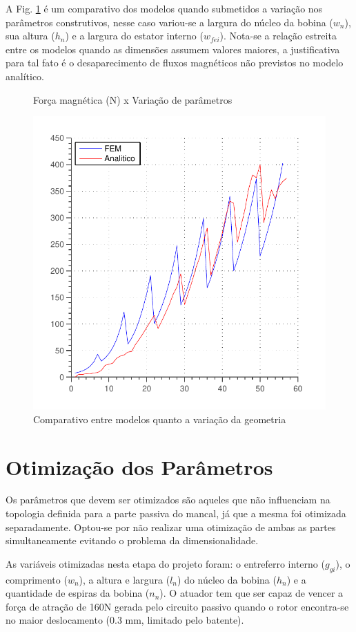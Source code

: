 A Fig. \ref{fig:validacao_ativo_2d} é um comparativo dos modelos quando submetidos a variação nos parâmetros construtivos, nesse caso variou-se a largura do núcleo da bobina ($w_n$), sua altura ($h_n$) e a largura do estator interno ($w_{fei}$). Nota-se a relação estreita entre os modelos quando as dimensões assumem valores maiores, a justificativa para tal fato é o desaparecimento de fluxos magnéticos não previstos no modelo analítico.

\begin{figure}[th]
	\centering
	\caption{Força magnética (N) x Variação de parâmetros}
	\includegraphics[width=0.7\linewidth]{Figs/Simulacoes/Ativo/validacao_ativo_2d}
	\caption{Comparativo entre modelos quanto a variação da geometria}
	\label{fig:validacao_ativo_2d}
\end{figure}

\section{Otimização dos Parâmetros}

Os parâmetros que devem ser otimizados são aqueles que não influenciam na topologia definida para a parte passiva do mancal, já que a mesma foi otimizada separadamente. Optou-se por não realizar uma otimização de ambas as partes simultaneamente evitando o problema da dimensionalidade.

As variáveis otimizadas nesta etapa do projeto foram:   o entreferro interno ($g_{gi}$), o comprimento ($w_n$), a altura  e largura ($l_n$) do núcleo da bobina ($h_n$) e a quantidade de espiras da bobina ($n_n$). O atuador tem que ser capaz de vencer a força de atração de 160N gerada pelo circuito passivo quando o rotor encontra-se no maior deslocamento (0.3 mm, limitado pelo batente). 

